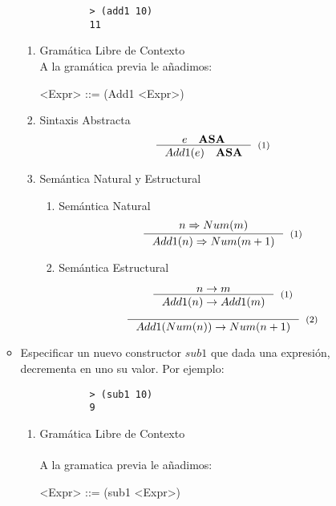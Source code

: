 \documentclass{article}
\begin{document}
\begin{enumerate}
\begin{itemize}
        \begin{verbatim}
            > (add1 10)
            11
        \end{verbatim}

        \begin{enumerate}
            \item Gramática Libre de Contexto
            \\
            A la gramática previa le añadimos:
            \\
            \begin{grammar}
                <Expr> ::= (Add1 <Expr>)
            \end{grammar}
            \item Sintaxis Abstracta
                \[
                \inference{e \quad \textbf{ASA}}{Add1(e) \quad \textbf{ASA}}[(1)]
                \]
            \item Semántica Natural y Estructural
            \begin{enumerate}
                \item Semántica Natural
                    \[
                        \inference{n \Rightarrow Num(m)}{Add1(n) \Rightarrow Num(m + 1)}[(1)]
                    \]
                \item Semántica Estructural

                    \[ \inference{n\rightarrow m}{Add1(n) 
                        \rightarrow Add1(m)}[(1)] \]
                    \[ \inference{}{Add1(Num(n)) \rightarrow Num(n + 1)}[(2)] \]
                
            \end{enumerate}
        \end{enumerate}

        \item Especificar un nuevo constructor $sub1$ que dada una expresión, decrementa en uno su valor. Por ejemplo:

        \begin{verbatim}
            > (sub1 10)
            9
        \end{verbatim}

        \begin{enumerate}
            \item Gramática Libre de Contexto
            \\ \\
            A la gramatica previa le añadimos:
            \\
            \begin{grammar}
                <Expr> ::= (sub1 <Expr>)
            \end{grammar}
            

\end{enumerate}
\end{itemize}
\end{enumerate}
\end{document}
